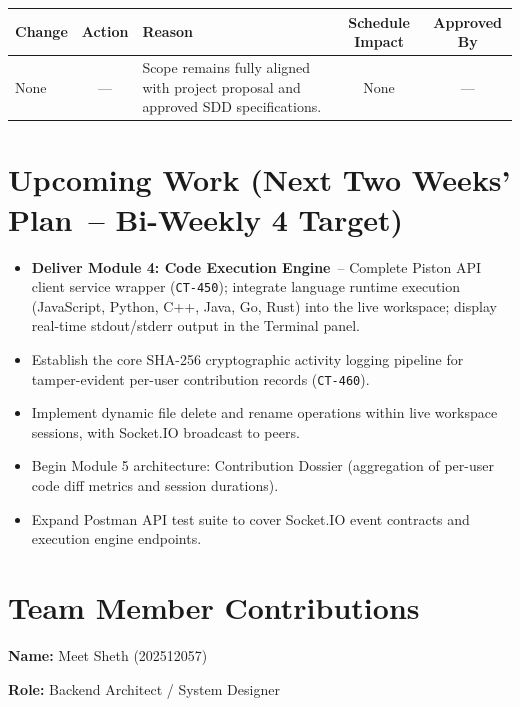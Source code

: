 \documentclass[11pt,a4paper]{article}
\newcommand{\field}[2]{\textbf{#1:} #2\par}
\begin{document}
\begin{table}[htbp]
\centering
\label{tab:scope-changes}
\renewcommand{\arraystretch}{1.25}

\begin{tabular}{p{3.0cm} c p{3.2cm} c c}
\toprule
\textbf{Change} &
\textbf{Action} &
\textbf{Reason} &
\textbf{Schedule Impact} &
\textbf{Approved By} \\
\midrule

None & --- & Scope remains fully aligned with project proposal and approved SDD specifications. & None & --- \\

\bottomrule
\end{tabular}
\end{table}

\section{Upcoming Work (Next Two Weeks' Plan~-- Bi-Weekly 4 Target)}

\begin{itemize}
    \item \textbf{Deliver Module 4: Code Execution Engine}~-- Complete Piston API client service wrapper (\texttt{CT-450}); integrate language runtime execution (JavaScript, Python, C++, Java, Go, Rust) into the live workspace; display real-time stdout/stderr output in the Terminal panel.
    \item Establish the core SHA-256 cryptographic activity logging pipeline for tamper-evident per-user contribution records (\texttt{CT-460}).
    \item Implement dynamic file delete and rename operations within live workspace sessions, with Socket.IO broadcast to peers.
    \item Begin Module 5 architecture: Contribution Dossier (aggregation of per-user code diff metrics and session durations).
    \item Expand Postman API test suite to cover Socket.IO event contracts and execution engine endpoints.
\end{itemize}

\section{Team Member Contributions}

\vspace{6pt}

\field{Name}{Meet Sheth (202512057)}
\field{Role}{Backend Architect / System Designer}
\end{document}
